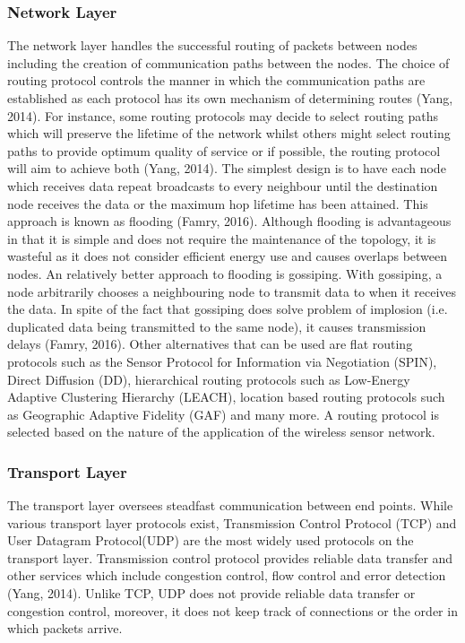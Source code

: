 \documentclass[a4paper]{article}
\begin{document}
\subsubsection*{Network Layer}
The network layer handles the successful routing of packets between nodes including the creation of communication paths between the nodes. The choice of routing protocol controls the manner in which the communication paths are established as each protocol has its own mechanism of determining routes (Yang, 2014). For instance, some routing protocols may decide to select routing paths which will preserve the lifetime of the network whilst others might select routing paths to provide optimum quality of service or if possible, the routing protocol will aim to achieve both (Yang, 2014). The simplest design is to have each node which receives data repeat broadcasts to every neighbour until the destination node receives the data or the maximum hop lifetime has been attained. This approach is known as flooding (Famry, 2016). Although flooding is advantageous in that it is simple and does not require the maintenance of the topology, it is wasteful as it does not consider efficient energy use and causes overlaps between nodes. An relatively better approach to flooding is gossiping. With gossiping, a node arbitrarily chooses a neighbouring node to transmit data to when it receives the data. In spite of the fact that gossiping does solve problem of implosion (i.e. duplicated data being transmitted to the same node), it causes transmission delays (Famry, 2016). Other alternatives that can be used are flat routing protocols such as the Sensor Protocol for Information via Negotiation (SPIN), Direct Diffusion (DD), hierarchical routing protocols such as Low-Energy Adaptive Clustering Hierarchy (LEACH), location based routing protocols such as Geographic Adaptive Fidelity (GAF) and many more. A routing protocol is selected based on the nature of the application of the wireless sensor network.

\subsubsection*{Transport Layer}
The transport layer oversees steadfast communication between end points. While various transport layer protocols exist, Transmission Control Protocol (TCP) and User Datagram Protocol(UDP) are the most widely used protocols on the transport layer. Transmission control protocol provides reliable data transfer and other services which include congestion control, flow control and error detection (Yang, 2014). Unlike TCP, UDP does not provide reliable data transfer or congestion control, moreover, it does not keep track of connections or the order in which packets arrive.  
\end{document}

